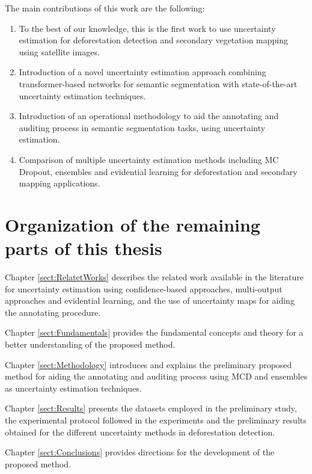 The main contributions of this work are the following:
\begin{enumerate}
  \item To the best of our knowledge, this is the first work to use uncertainty estimation for deforestation detection and secondary vegetation mapping using satellite images.
  \item Introduction of a novel uncertainty estimation approach combining transformer-based networks for semantic segmentation with state-of-the-art uncertainty estimation techniques.
  \item Introduction of an operational methodology to aid the annotating and auditing process in semantic segmentation tasks, using uncertainty estimation.
  \item Comparison of multiple uncertainty estimation methods including MC Dropout, ensembles and evidential learning for deforestation and secondary mapping applications.
  

\end{enumerate}

\section{Organization of the remaining parts of this thesis}

Chapter \ref{sect:RelatetWorks} describes the related work available in the literature for uncertainty estimation using confidence-based approaches, multi-output approaches and evidential learning, and the use of uncertainty maps for aiding the annotating procedure.

Chapter \ref{sect:Fundamentals} provides the fundamental concepts and theory for a better understanding of the proposed method.

Chapter \ref{sect:Methodology} introduces and explains the preliminary proposed method for aiding the annotating and auditing process using MCD and ensembles as uncertainty estimation techniques.

Chapter \ref{sect:Results} presents the datasets employed in the preliminary study, the experimental protocol followed in the experiments and the preliminary results obtained for the different uncertainty methods in deforestation detection.

Chapter \ref{sect:Conclusions} provides directions for the development of the proposed method.

